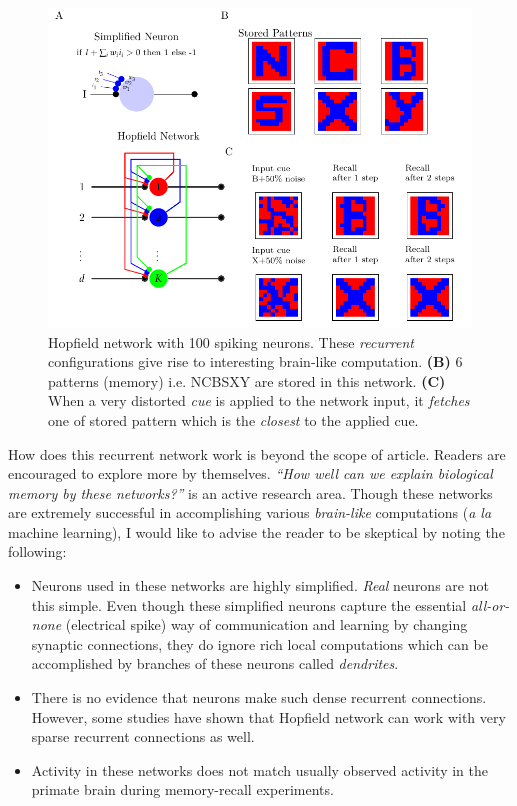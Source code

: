 \documentclass[]{resonance}
\begin{document}
\begin{figure}[!b]
    \centering
    \caption{Hopfield network with 100 spiking neurons. These \emph{recurrent} 
        configurations give rise to interesting brain-like
        computation. \textbf{(B)} 6 patterns (memory) i.e. NCBSXY are stored in this
        network. \textbf{(C)} When a very distorted \textit{cue} is applied to
        the network input, it \textit{fetches} one of stored pattern which is
        the \emph{closest} to the applied cue.
    }\label{fig:hopfield}
    \includegraphics[width=\linewidth]{./hopfield.pdf}
\end{figure}

How does this recurrent network work is beyond the scope of article. Readers are
encouraged to explore more by themselves. \emph{``How well can we explain
biological memory by these networks?''} is an active research area.  Though
these networks are extremely successful in accomplishing various
\textit{brain-like} computations (\textit{a la} machine learning), I would like
to advise the reader to be skeptical by noting the following:

\begin{itemize}
    \item  Neurons used in these networks are highly simplified. \textit{Real}
        neurons are not this simple. Even though these simplified neurons
        capture the essential \textit{all-or-none} (electrical spike) way of
        communication and learning by changing synaptic connections, they do
        ignore rich local computations which can be accomplished by branches of
        these neurons called \textit{dendrites}.
    \item  There is no evidence that neurons make such dense recurrent
        connections. However, some studies have shown that Hopfield network can
        work with very sparse recurrent connections as well.
    \item Activity in these networks does not match usually observed activity 
        in the primate brain during memory-recall experiments.
\end{itemize}
\end{document}
